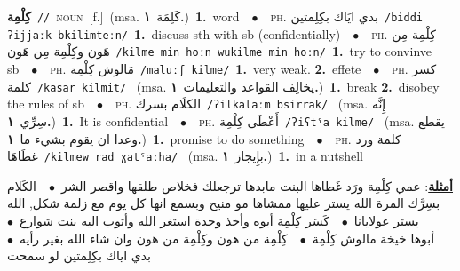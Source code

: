 \documentclass[10pt,a4paper,twoside]{article} %
\begin{document}
\begin{multicols}{2}
{\setlength\topsep{0pt}\textbf{\foreignlanguage{arabic}{كِلْمِة}}\ {\color{gray}\texttt{//}\color{black}}\ \textsc{noun}\ [f.]\ \color{gray}(msa. \foreignlanguage{arabic}{كَلِمَة}~\foreignlanguage{arabic}{\textbf{١.}})\color{black}\ \textbf{1.}~word\ \ $\bullet$\ \ \textsc{ph.} \color{gray} \foreignlanguage{arabic}{بدي ايَاك بكِلِمتين}\color{black}\ {\color{gray}\texttt{/{\sffamily biddi ʔijjaːk bkilimteːn}/}\color{black}}\ \textbf{1.}~discuss sth with sb (confidentially)\ \ $\bullet$\ \ \textsc{ph.} \color{gray} \foreignlanguage{arabic}{كِلْمِة مِن هَون وكِلْمِة مِن هَون}\color{black}\ {\color{gray}\texttt{/{\sffamily kilme min hoːn wukilme min hoːn}/}\color{black}}\ \textbf{1.}~try to convinve sb\ \ $\bullet$\ \ \textsc{ph.} \color{gray} \foreignlanguage{arabic}{مَالوش كِلْمِة}\color{black}\ {\color{gray}\texttt{/{\sffamily maluːʃ kilme}/}\color{black}}\ \textbf{1.}~very weak.  \textbf{2.}~effete\ \ $\bullet$\ \ \textsc{ph.} \color{gray} \foreignlanguage{arabic}{كسر كلمة}\color{black}\ {\color{gray}\texttt{/{\sffamily kasar kilmit}/}\color{black}}\ \color{gray} (msa. \foreignlanguage{arabic}{يخالِف القواعد والتعليمات}~\foreignlanguage{arabic}{\textbf{١.}})\color{black}\ \textbf{1.}~break  \textbf{2.}~disobey the rules of sb\ \ $\bullet$\ \ \textsc{ph.} \color{gray} \foreignlanguage{arabic}{الكلَام بسرك}\color{black}\ {\color{gray}\texttt{/{\sffamily ʔilkalaːm bsirrak}/}\color{black}}\ \color{gray} (msa. \foreignlanguage{arabic}{إِنَّه سِرِّي}~\foreignlanguage{arabic}{\textbf{١.}})\color{black}\ \textbf{1.}~It is confidential\ \ $\bullet$\ \ \textsc{ph.} \color{gray} \foreignlanguage{arabic}{أَعْطَى كِلْمِة}\color{black}\ {\color{gray}\texttt{/{\sffamily ʔiʕtˤa kilme}/}\color{black}}\ \color{gray} (msa. \foreignlanguage{arabic}{يقطع وعدا ان يقوم بشيء ما}~\foreignlanguage{arabic}{\textbf{١.}})\color{black}\ \textbf{1.}~promise to do something\ \ $\bullet$\ \ \textsc{ph.} \color{gray} \foreignlanguage{arabic}{كلمة ورد غطَاهَا}\color{black}\ {\color{gray}\texttt{/{\sffamily kilmew rad ɣatˤaːha}/}\color{black}}\ \color{gray} (msa. \foreignlanguage{arabic}{بإِيجاز}~\foreignlanguage{arabic}{\textbf{١.}})\color{black}\ \textbf{1.}~in a nutshell\  \begin{flushright}\color{gray}\foreignlanguage{arabic}{\textbf{\underline{\foreignlanguage{arabic}{أمثلة}}}: عمي كِلْمِة ورَد غَطاها البنت مابدها ترجعلك فخلاص طلقها واقصر الشر\ $\bullet$\ \  الكَلام بسِرَّك المرة الله يستر عليها ممشاها مو منيح وبسمع انها كل يوم مع زلمة شكل, الله يستر عولايانا\ $\bullet$\ \  كَسَر كِلْمِة أبوه وأخذ وحدة استغر الله وأتوب اليه بنت شوارع\ $\bullet$\ \  أبوها خيخة مالوش كِلْمِة\ $\bullet$\ \  كِلْمِة من هون وكِلْمِة من هون وان شاء الله بغير رأيه\ $\bullet$\ \  بدي اياك بكِلِمتين لو سمحت}\end{flushright}\color{black}} \vspace{2mm}


\end{multicols}
\end{document}
